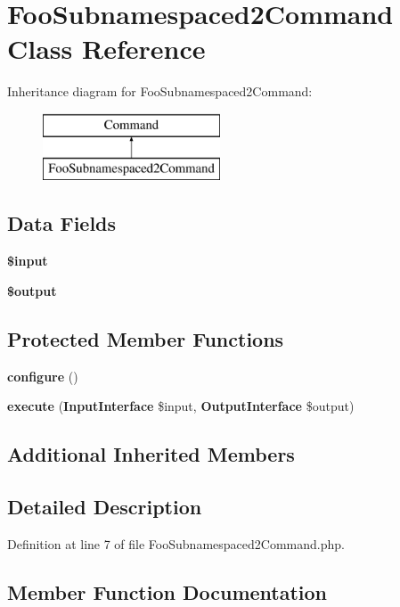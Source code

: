 \section{Foo\+Subnamespaced2\+Command Class Reference}
\label{class_foo_subnamespaced2_command}
Inheritance diagram for Foo\+Subnamespaced2\+Command\+:\begin{figure}[H]
\begin{center}
\leavevmode
\includegraphics[height=2.000000cm]{class_foo_subnamespaced2_command}
\end{center}
\end{figure}
\subsection*{Data Fields}
\begin{DoxyCompactItemize}
\item 
{\bf \$input}
\item 
{\bf \$output}
\end{DoxyCompactItemize}
\subsection*{Protected Member Functions}
\begin{DoxyCompactItemize}
\item 
{\bf configure} ()
\item 
{\bf execute} ({\bf Input\+Interface} \$input, {\bf Output\+Interface} \$output)
\end{DoxyCompactItemize}
\subsection*{Additional Inherited Members}


\subsection{Detailed Description}


Definition at line 7 of file Foo\+Subnamespaced2\+Command.\+php.



\subsection{Member Function Documentation}
